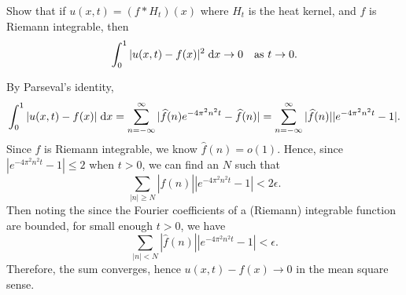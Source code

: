 \begin{exrc}[11]
    Show that if \(u(x, t) = (f * H_t)(x)\) where \(H_t\) is the heat kernel,
    and \(f\) is Riemann integrable, then
    \begin{equation*}
        \int_{0}^{1} |u(x, t) - f(x)|^2 \;\mathrm d x \to 0 \quad \text{as \(t \to 0\)}.
    \end{equation*}

\begin{soln}
    By Parseval's identity,
    \begin{equation*}
        \int_{0}^{1} |u(x, t) - f(x)| \;\mathrm d x
        = \sum_{n = -\infty}^{\infty} |\widehat{f}(n) e^{-4 \pi^2 n^2 t} - \widehat{f}(n)|
        = \sum_{n = -\infty}^{\infty} |\widehat{f}(n)| |e^{-4 \pi^2 n^2 t} - 1|.
    \end{equation*}
    Since \(f\) is Riemann integrable, we know \(\hat{f}(n) = o(1)\).
    Hence, since \(|e^{-4 \pi^2 n^2 t} - 1| \leq 2\) when \(t > 0\),
    we can find an \(N\) such that
    \begin{equation*}
        \sum_{|n| \geq N}^{} |\hat{f}(n)| |e^{-4 \pi^2 n^2 t} - 1| < 2\epsilon.
    \end{equation*}
    Then noting the since the Fourier coefficients of a (Riemann) integrable
    function are bounded, for small enough \(t > 0\), we have
    \begin{equation*}
        \sum_{|n| < N}^{} |\hat{f}(n)| |e^{-4 \pi^2 n^2 t} - 1| < \epsilon.
    \end{equation*}
    Therefore, the sum converges, hence \(u(x, t) - f(x) \to 0\) in the mean square sense.

\end{soln}
\end{exrc}
